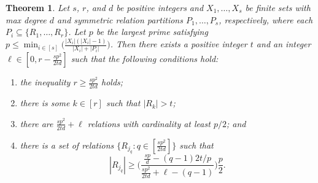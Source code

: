\documentclass[12pt]{article}
\DeclarePairedDelimiter\ceil{\lceil}{\rceil}
\DeclarePairedDelimiter\floor{\lfloor}{\rfloor}
\newtheorem{thm}{Theorem}[section] %
\theoremstyle{definition}
\begin{document}
	\begin{thm}\label{Thm-MainMultipleSetResult}
		Let $s$, $r$, and $d$ be positive integers and $X_1,\ldots, X_s$ be finite sets with max degree $d$ and symmetric relation partitions $P_1,\ldots,P_s$, respectively, where each $P_i \subseteq \{R_1, \ldots, R_r\}$.  Let $p$ be the largest prime satisfying $p \leq \min_{i \in [s]}\big(\tfrac{|X_i|(|X_i|-1)}{|X_i|+|P_i|} \big)$.  Then there exists a positive integer $t$ and an integer $\ell \in [0, r-\tfrac{sp^2}{2td}]$ such that the following conditions hold:
		\begin{enumerate}
			\item the inequality $r \geq \tfrac{sp^2}{2td}$ holds;
			\item there is some $k \in [r]$ such that $|R_k| > t$;
			\item there are $\tfrac{sp^2}{2td} + \ell$ relations with cardinality at least $p/2$; and
			\item there is a set of relations $\{R_{j_q}: q \in [\tfrac{sp^2}{2td}]\}$ such that 
			$$|R_{j_q}| \geq \biggr(\frac{\tfrac{sp}{d}-(q-1)2t/p}{\tfrac{sp^2}{2td} + \ell-(q-1)} \biggr)\frac{p}{2}.$$
		\end{enumerate}
	\end{thm}
\end{document}
